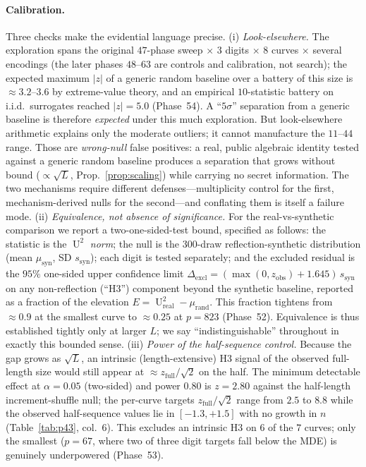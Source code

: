 \documentclass[11pt]{article}
\theoremstyle{definition}
\DeclareMathOperator{\Uk}{U}
\begin{document}
\paragraph{Calibration.} Three checks make the evidential language
precise. (i) \emph{Look-elsewhere.} The exploration spans the original $47$-phase sweep
$\times$ $3$ digits $\times$ $8$ curves $\times$ several encodings (the
later phases $48$--$63$ are controls and calibration, not search);
the expected maximum $|z|$ of a generic random baseline over a battery of
this size is $\approx3.2$--$3.6$ by extreme-value theory, and an empirical
$10$-statistic battery on i.i.d.\ surrogates reached $|z|=5.0$ (Phase~54).
A ``$5\sigma$'' separation from a generic baseline is therefore
\emph{expected} under this much exploration. But look-elsewhere
arithmetic explains only the moderate outliers; it cannot manufacture the
$11$--$44$ range. Those are \emph{wrong-null} false positives: a real,
public algebraic identity tested against a generic random baseline
produces a separation that grows without bound ($\propto\sqrt L$,
Prop.~\ref{prop:scaling}) while carrying no secret information. The two
mechanisms require different defenses---multiplicity control for the
first, mechanism-derived nulls for the second---and conflating them is
itself a failure mode. (ii)
\emph{Equivalence, not absence of significance.} For the real-vs-synthetic
comparison we report a two-one-sided-test bound, specified as follows:
the statistic is the $\Uk^2$ \emph{norm}; the null is the $300$-draw
reflection-synthetic distribution (mean $\mu_{\mathrm{syn}}$, SD
$s_{\mathrm{syn}}$); each digit is tested separately; and the excluded
residual is the $95\%$ one-sided upper confidence limit
$\Delta_{\mathrm{excl}}=(\max(0,z_{\mathrm{obs}})+1.645)\,s_{\mathrm{syn}}$
on any non-reflection (``H3'') component beyond the synthetic baseline,
reported as a fraction of the elevation
$E=\Uk^2_{\mathrm{real}}-\mu_{\mathrm{rand}}$. This fraction tightens
from $\approx0.9$ at the smallest curve to $\approx0.25$ at $p=823$
(Phase~52). Equivalence is thus established tightly only at larger $L$;
we say ``indistinguishable'' throughout in exactly this bounded sense.
(iii) \emph{Power of the half-sequence control.} Because the gap grows as
$\sqrt L$, an intrinsic (length-extensive) H3 signal of the observed
full-length size would still appear at
$\approx z_{\mathrm{full}}/\sqrt2$ on the half. The minimum detectable
effect at $\alpha=0.05$ (two-sided) and power $0.80$ is $z=2.80$ against
the half-length increment-shuffle null; the per-curve targets
$z_{\mathrm{full}}/\sqrt2$ range from $2.5$ to $8.8$ while the observed
half-sequence values lie in $[-1.3,+1.5]$ with no growth in $n$
(Table~\ref{tab:p43}, col.~6). This excludes an intrinsic H3 on $6$ of
the $7$ curves; only the smallest ($p=67$, where two of three digit
targets fall below the MDE) is genuinely underpowered (Phase~53).
\end{document}
